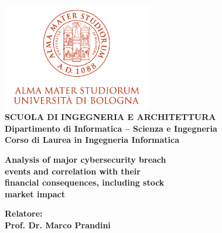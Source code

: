\begin{titlepage}
\begin{center}
\includegraphics[width=2.56in]{figures/logo/logo_unibo.png}\\
\vspace{5mm}
{\small{\bf SCUOLA DI INGEGNERIA E ARCHITETTURA\\
\vspace{2mm}
Dipartimento di Informatica -- Scienza e Ingegneria\\
\vspace{2mm}
Corso di Laurea in Ingegneria Informatica }}
\end{center}
\vspace{1.2mm}
\begin{center}
{\LARGE{\bf Analysis of major cybersecurity breach\\
\vspace{1mm}
events and correlation with their\\
\vspace{1mm}
financial consequences, including stock\\
\vspace{1mm}
market impact\\
\vspace{1mm}}}
\end{center}
\vspace{11.9mm}
\par
\noindent
\begin{minipage}[t]{0.47\textwidth}
{\normalsize{\bf Relatore:\\
Prof. Dr. Marco Prandini

}}
\end{minipage}
\end{titlepage}
